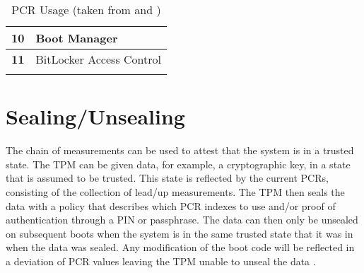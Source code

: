 \begin{table}[htb]
\begin{tabularx}{1.0\textwidth}{cX}
        \midrule
        \textbf{10}                 & Boot Manager                                                                                             \\[\defaultaddspace]
        \midrule
        \textbf{11}                 & BitLocker Access Control                                                                                 \\
        \arrayrulecolor{black}
        \bottomrule
    \end{tabularx}%
    \caption[\acs{PCR} Usage]{\ac{PCR} Usage (taken from \cite[Table 1]{tcg-pc-client-platform-firmware-profile-spec} and \cite[Table 9-2]{windows-internals-6-part2})}%
    \label{tab:pcr-usage}%
\end{table}


\section{Sealing/Unsealing}

The chain of measurements can be used to attest that the system is in a trusted state.
The \ac{TPM} can be given data, for example, a cryptographic key, in a state that is assumed to be trusted.
This state is reflected by the current \acp{PCR}, consisting of the collection of lead\-/up measurements.
The \ac{TPM} then seals the data with a policy that describes which \ac{PCR} indexes to use and/or proof of authentication through a \ac{PIN} or passphrase.
The data can then only be unsealed on subsequent boots when the system is in the same trusted state that it was in when the data was sealed.
Any modification of the boot code will be reflected in a deviation of \ac{PCR} values leaving the \ac{TPM} unable to unseal the data \cite[Section 3.3.6]{trusted-computing-platforms}.